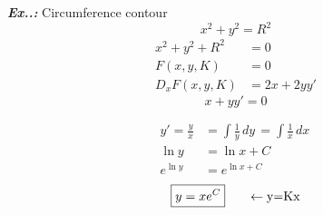 \documentclass[a4paper]{article}
\begin{document}
\vspace{2ex}\textbf{\textit{Ex.\thesection.\theex: }}Circumference contour
$$
x^{2}+y^{2}=R^{2}
$$
\begin{align}
x^{2}+y^{2}+R^{2}&=0 \\
F(x,y,K)&=0 \\
D_{x}F(x,y,K)&=2x+2yy'
\end{align}
$$
\boxed{x+yy'=0}
$$
\vspace{1ex}\vspace{1ex}

\begin{align}
y'=\frac{y}{x}&=\int \frac{1}{y} \, dy\, =\int \frac{1}{x} \, dx\,  \\
\ln y&=\ln x+C \\
e^{ \ln y }&=e^{ \ln x+C }
\end{align}
$$
\boxed{y=xe^{ C }}\hspace{4ex}\leftarrow\text{y=Kx}
$$
\end{document}

